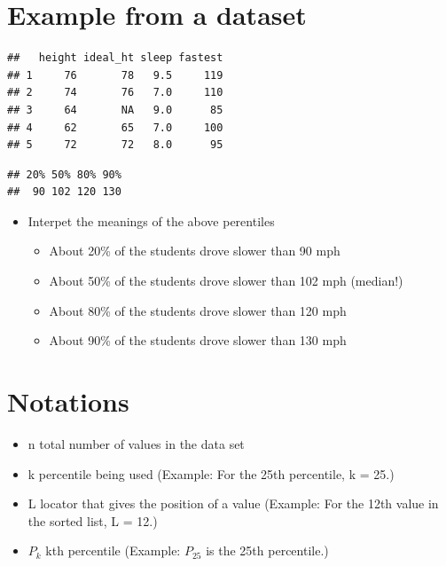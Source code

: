 \documentclass[]{book}
\providecommand{\tightlist}{%
  \setlength{\itemsep}{0pt}\setlength{\parskip}{0pt}}
\begin{document}
\hypertarget{example-from-a-dataset}{%
\section{Example from a dataset}\label{example-from-a-dataset}}

\begin{verbatim}
##   height ideal_ht sleep fastest
## 1     76       78   9.5     119
## 2     74       76   7.0     110
## 3     64       NA   9.0      85
## 4     62       65   7.0     100
## 5     72       72   8.0      95
\end{verbatim}

\begin{verbatim}
## 20% 50% 80% 90% 
##  90 102 120 130
\end{verbatim}

\begin{itemize}
\tightlist
\item
  Interpet the meanings of the above perentiles

  \begin{itemize}
  \tightlist
  \item
    About 20\% of the students drove slower than 90 mph
  \item
    About 50\% of the students drove slower than 102 mph (median!)
  \item
    About 80\% of the students drove slower than 120 mph
  \item
    About 90\% of the students drove slower than 130 mph
  \end{itemize}
\end{itemize}

\hypertarget{notations-2}{%
\section{Notations}\label{notations-2}}

\begin{itemize}
\tightlist
\item
  n total number of values in the data set
\item
  k percentile being used (Example: For the 25th percentile, k = 25.)
\item
  L locator that gives the position of a value (Example: For the 12th value in the sorted list, L = 12.)
\item
  \(P_k\) kth percentile (Example: \(P_{25}\) is the 25th percentile.)
\end{itemize}
\end{document}
